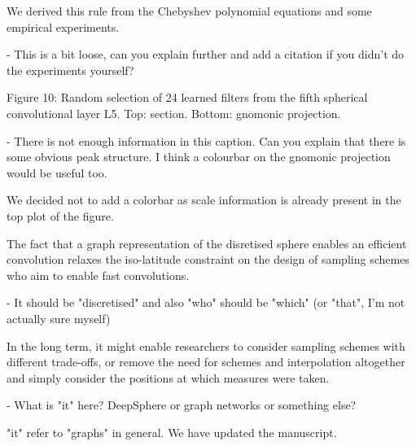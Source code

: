 \documentclass[12pt,a4paper]{article}
\newcommand{\nati}[1]{{\color[rgb]{.1,.6,.1}{NP: #1}}}
\newcommand{\todo}[1]{{\color[rgb]{.6,.1,.6}{TODO: #1}}}
\newcommand{\1}{\b{1}}              %
\newcommand{\0}{\b{0}}              %
\begin{document}
\begin{mdframed}[style=comment]
We derived this rule from the Chebyshev polynomial equations and some empirical experiments.

- This is a bit loose, can you explain further and add a citation if you didn't do the experiments yourself?
\end{mdframed}
\todo{Assign: @nati, @michael}
\nati{We would need an appendix to do that. It is the last figure of the figure’s notebook (expected filter). I could spend two hours and write some equation... @michael, what do you think?}

\begin{mdframed}[style=comment]
Figure 10: Random selection of 24 learned filters from the fifth spherical convolutional layer L5. Top: section. Bottom: gnomonic projection.

- There is not enough information in this caption. Can you explain that there is some obvious peak structure. I think a colourbar on the gnomonic projection would be useful too.
\end{mdframed}
\todo{Assign: @all}
\nati{The problem is that random filters are picky as well and look very similar. Should we say that? I do not think a colorbar is necessary since there are numbered axes on the top plots. Do you agree?}

We decided not to add a colorbar as scale information is already present in the top plot of the figure.

\begin{mdframed}[style=comment]
The fact that a graph representation of the disretised sphere enables an efficient convolution relaxes the iso-latitude constraint on the design of sampling schemes who aim to enable fast convolutions.

- It should be "discretised" and also "who" should be "which" (or "that", I'm not actually sure myself)
\end{mdframed}
\todo{Assign: @tomek -> \nati{I corrected it with "which". Do you agree? }}

\begin{mdframed}[style=comment]
In the long term, it might enable researchers to consider sampling schemes with different trade-offs, or remove the need for schemes and interpolation altogether and simply consider the positions at which measures were taken.

- What is "it" here? DeepSphere or graph networks or something else?
\end{mdframed}
"it" refer to "graphs" in general. We have updated the manuscript.
\end{document}
